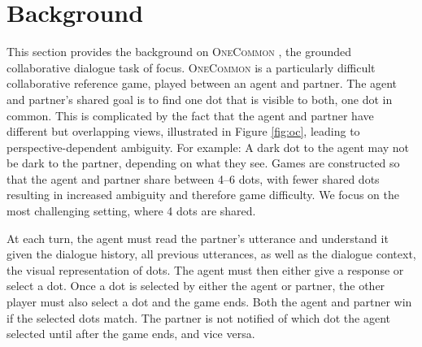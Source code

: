 \documentclass[11pt]{article}
\begin{document}
\section{Background}
This section provides the background on \textsc{OneCommon} \citep{onecommon},
the grounded collaborative dialogue task of focus.
\textsc{OneCommon} is a particularly difficult collaborative reference game,
played between an agent and partner.
The agent and partner's shared goal is to find one dot that is visible to both,
one dot in common.
This is complicated by the fact that the agent and partner have different but 
overlapping views, illustrated in Figure \ref{fig:oc},
leading to perspective-dependent ambiguity.
For example: A dark dot to the agent may not be dark to the partner, depending on what they see.
Games are constructed so that the agent and partner share between 4--6 dots,
with fewer shared dots resulting in increased ambiguity and therefore game difficulty.
We focus on the most challenging setting, where 4 dots are shared.

At each turn, the agent must read the partner's utterance
and understand it given the dialogue history, all previous utterances,
as well as the dialogue context, the visual representation of dots.
The agent must then either give a response or select a dot.
Once a dot is selected by either the agent or partner, the other player
must also select a dot and the game ends.
Both the agent and partner win if the selected dots match.
The partner is not notified of which dot the agent selected
until after the game ends, and vice versa.
\end{document}
